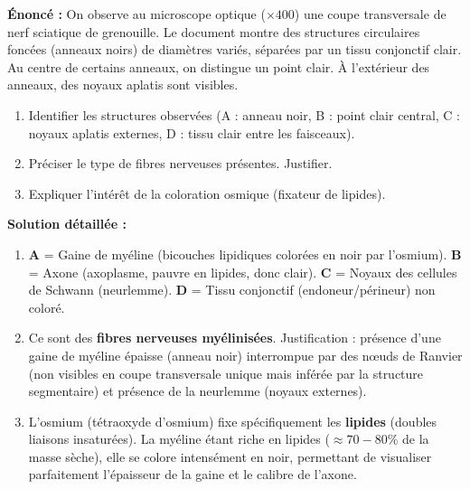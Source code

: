 \documentclass[11pt]{article}
\begin{document}
\begin{exoresolu}
\textbf{Énoncé :} On observe au microscope optique ($\times 400$) une coupe transversale de nerf sciatique de grenouille. Le document montre des structures circulaires foncées (anneaux noirs) de diamètres variés, séparées par un tissu conjonctif clair. Au centre de certains anneaux, on distingue un point clair. À l'extérieur des anneaux, des noyaux aplatis sont visibles.
\begin{enumerate}
    \item Identifier les structures observées (A : anneau noir, B : point clair central, C : noyaux aplatis externes, D : tissu clair entre les faisceaux).
    \item Préciser le type de fibres nerveuses présentes. Justifier.
    \item Expliquer l'intérêt de la coloration osmique (fixateur de lipides).
\end{enumerate}
\tcblower
\textbf{Solution détaillée :}
\begin{enumerate}
    \item \textbf{A} = Gaine de myéline (bicouches lipidiques colorées en noir par l'osmium). \textbf{B} = Axone (axoplasme, pauvre en lipides, donc clair). \textbf{C} = Noyaux des cellules de Schwann (neurlemme). \textbf{D} = Tissu conjonctif (endoneur/périneur) non coloré.
    \item Ce sont des \textbf{fibres nerveuses myélinisées}. Justification : présence d'une gaine de myéline épaisse (anneau noir) interrompue par des nœuds de Ranvier (non visibles en coupe transversale unique mais inférée par la structure segmentaire) et présence de la neurlemme (noyaux externes).
    \item L'osmium (tétraoxyde d'osmium) fixe spécifiquement les \textbf{lipides} (doubles liaisons insaturées). La myéline étant riche en lipides ($\approx 70-80\%$ de la masse sèche), elle se colore intensément en noir, permettant de visualiser parfaitement l'épaisseur de la gaine et le calibre de l'axone.
\end{enumerate}
\end{exoresolu}
\end{document}
